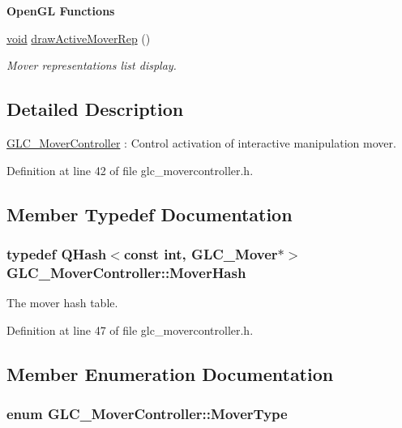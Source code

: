 \begin{Indent}{\bf Open\-G\-L Functions}\par
\begin{DoxyCompactItemize}
\item 
\hyperlink{group___u_a_v_objects_plugin_ga444cf2ff3f0ecbe028adce838d373f5c}{void} \hyperlink{class_g_l_c___mover_controller_abb2a9b3fc1fc545a2e34bfc6bbceaa36}{draw\-Active\-Mover\-Rep} ()
\begin{DoxyCompactList}\small\item\em Mover representations list display. \end{DoxyCompactList}\end{DoxyCompactItemize}
\end{Indent}


\subsection{Detailed Description}
\hyperlink{class_g_l_c___mover_controller}{G\-L\-C\-\_\-\-Mover\-Controller} \-: Control activation of interactive manipulation mover. 

Definition at line 42 of file glc\-\_\-movercontroller.\-h.



\subsection{Member Typedef Documentation}
\hypertarget{class_g_l_c___mover_controller_ab7dea356f0b6ba626dac8278012f8f40}{
\subsubsection[{Mover\-Hash}]{\setlength{\rightskip}{0pt plus 5cm}typedef Q\-Hash$<$const {\bf int}, {\bf G\-L\-C\-\_\-\-Mover}$\ast$$>$ {\bf G\-L\-C\-\_\-\-Mover\-Controller\-::\-Mover\-Hash}}}\label{class_g_l_c___mover_controller_ab7dea356f0b6ba626dac8278012f8f40}


The mover hash table. 



Definition at line 47 of file glc\-\_\-movercontroller.\-h.



\subsection{Member Enumeration Documentation}
\hypertarget{class_g_l_c___mover_controller_a574d11af2d0143e7e72f584fabab381f}{
\subsubsection[{Mover\-Type}]{\setlength{\rightskip}{0pt plus 5cm}enum {\bf G\-L\-C\-\_\-\-Mover\-Controller\-::\-Mover\-Type}}}\label{class_g_l_c___mover_controller_a574d11af2d0143e7e72f584fabab381f}


